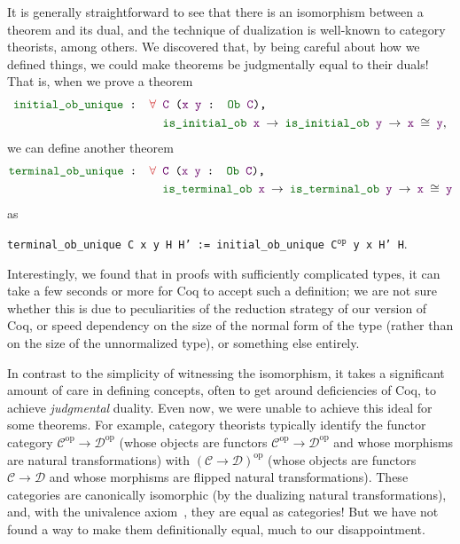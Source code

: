 \documentclass[runningheads]{llncs}
\newcommand{\cat}[1]{\ensuremath{\mathcal{#1}}}
\newcommand{\colortext}[2]{\textcolor{#1}{#2}}
\newcommand{\coqdockw}[1]{\texttt {\colortext{kwred}{#1}}}
\newcommand{\coqdocvar}[1]{\colortext{varpurple}{#1}}
\newcommand{\coqdoccst}[1]{\texttt{\colortext{defgreen}{#1}}}%
\newcommand{\coqdocdefinition}[1]{\coqdoccst{#1}}
\newcommand{\coqdocvariable}[1]{\coqdocvar{#1}}
\newcommand{\coqdocprojection}[1]{\coqdoccst{#1}}
\newcommand{\coqdocnotation}[1]{\coqdockw{#1}}
\begin{document}
  It is generally straightforward to see that there is an isomorphism between a theorem and its dual, and the technique of dualization is well-known to category theorists, among others.  We discovered that, by being careful about how we defined things, we could make theorems be judgmentally equal to their duals!  That is, when we prove a theorem
  \begin{align*}
  \texttt{\coqdocdefinition{initial\_ob\_unique} : \coqdockw{$\forall$} } & \texttt{\coqdocvariable{C} (\coqdocvariable{x y} : \coqdocprojection{Ob} \coqdocvariable{C}),} \\ & \texttt{\coqdocdefinition{is\_initial\_ob} \coqdocvariable{x} $\to$ \coqdocdefinition{is\_initial\_ob} \coqdocvariable{y} $\to$ \coqdocvariable{x} $\cong$ \coqdocvariable{y}},
  \end{align*}
  we can define another theorem
  \begin{align*}
  \texttt{\coqdocdefinition{terminal\_ob\_unique} : \coqdockw{$\forall$} } & \texttt{\coqdocvariable{C} (\coqdocvariable{x y} : \coqdocprojection{Ob} \coqdocvariable{C}),} \\ & \texttt{\coqdocdefinition{is\_terminal\_ob} \coqdocvariable{x} $\to$ \coqdocdefinition{is\_terminal\_ob} \coqdocvariable{y} $\to$ \coqdocvariable{x} $\cong$ \coqdocvariable{y}}
  \end{align*}
  as
  \begin{center}
  \texttt{\coqdocdefinition{terminal\_ob\_unique} \coqdocvariable{C x y H H'} := \coqdocdefinition{initial\_ob\_unique} \coqdocvariable{C}\coqdocnotation{$^{\texttt{op}}$} \coqdocvariable{y x H' H}}.
  \end{center}
  Interestingly, we found that in proofs with sufficiently complicated types, it can take a few seconds or more for Coq to accept such a definition; we are not sure whether this is due to peculiarities of the reduction strategy of our version of Coq, or speed dependency on the size of the normal form of the type (rather than on the size of the unnormalized type), or something else entirely.

  In contrast to the simplicity of witnessing the isomorphism, it takes a significant amount of care in defining concepts, often to get around deficiencies of Coq, to achieve \emph{judgmental} duality.  Even now, we were unable to achieve this ideal for some theorems.  For example, category theorists typically identify the functor category $\cat{C}^\text{op} \to \cat{D}^\text{op}$ (whose objects are functors $\cat{C}^\text{op} \to \cat{D}^\text{op}$ and whose morphisms are natural transformations) with $(\cat{C} \to \cat{D})^\text{op}$ (whose objects are functors $\cat{C} \to \cat{D}$ and whose morphisms are flipped natural transformations).  These categories are canonically isomorphic (by the dualizing natural transformations), and, with the univalence axiom~\cite{HoTTBook}, they are equal as categories!  But we have not found a way to make them definitionally equal, much to our disappointment.
\end{document}
